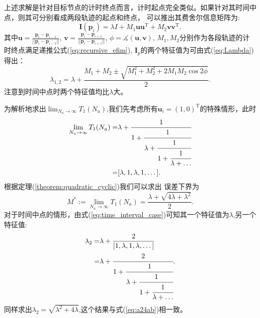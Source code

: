 \begin{remark}

上述求解是针对目标节点的计时终点而言，计时起点完全类似。如果针对其时间中点，则其可分别看成两段轨迹的起点和终点，
可以推出其费舍尔信息矩阵为:
\begin{equation}
\bm{I}(\bm{p}_i)=\lambda I+M_1\bm{u}\bm{u}^{\textrm{T}} +M_2\bm{v}\bm{v}^{\textrm{T}}.
\end{equation}
其中$\bm{u}=\frac{\bm{p}_i-\bm{p}_{i-1}}{||\bm{p}_i-\bm{p}_{i-1}||}$,
$\bm{v}=\frac{\bm{p}_i-\bm{p}_{i+1}}{||\bm{p}_i-\bm{p}_{i+1}||}$,
$\phi=\measuredangle(\bm{u},\bm{v})$,
$M_1,M_2$分别作为各段轨迹的计时终点满足递推公式(\ref{eq:recursive_efim}),
$\bm{I}_p$的两个特征值为可由式(\ref{eq:Lambda})得出：
\begin{equation}\label{eq:time_interval_case}
\lambda_{1,2}=\lambda+\frac{M_1+M_2\pm \sqrt{M_1^2+M_2^2+2M_1M_2\cos2\phi}}{2}.
\end{equation}
注意到时间中点时两个特征值均比$\lambda$大。
\end{remark}
为解析地求出$\lim_{N_a\to \infty}T_1(N_a)$,我们先考虑所有$\bm{u}_i=(1,0)^{\textrm{T}} $的特殊情形，此时
\begin{align}\notag\label{eq:gcf_1}
\lim_{N_a\to \infty}T_1(N_a)=&\lambda+\cfrac{1}{1+\cfrac{1}{\lambda+\cfrac{1}{1+\cfrac{1}{\lambda+\dots}}}}\\
=&[\lambda,1,\lambda,1,\dots].
\end{align}
根据定理(\ref{theorem:quadratic_cyclic})我们可以求出
误差下界为
\begin{equation}\label{eq:starting_or_ending}
M^*:=\lim_{N_a\to \infty}T_1(N_a)=\frac{\lambda+\sqrt{4\lambda+\lambda^2}}{2}.
\end{equation}
对于时间中点的情形，由式(\ref{eq:time_interval_case})可知其一个特征值为$\lambda$,另一个特征值:
\begin{align}\notag
\lambda_2=&\lambda+\frac{2}{[1,\lambda,1,\lambda,\dots]}\\
=&\lambda+\cfrac{2}{1+\cfrac{1}{\lambda+\cfrac{1}{1+\cfrac{1}{\lambda+\dots}}}}.
\end{align}
同样求出$\lambda_2=\sqrt{\lambda^2+4\lambda}$,这个结果与式(\ref{eq:a24ab})相一致。


